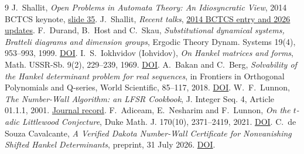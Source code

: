 \documentclass[10pt]{article}
\begin{document}
\begin{thebibliography}{9}\small\setlength{\itemsep}{1pt}
 J.~Shallit, \emph{Open Problems in Automata Theory: An Idiosyncratic View}, 2014 BCTCS keynote, \href{https://cs.uwaterloo.ca/~shallit/Talks/bc4.pdf#page=35}{slide 35}.
 J.~Shallit, \emph{Recent talks}, \href{https://cs.uwaterloo.ca/~shallit/talks.html}{2014 BCTCS entry and 2026 updates}.
 F.~Durand, B.~Host and C.~Skau, \emph{Substitutional dynamical systems, Bratteli diagrams and dimension groups}, Ergodic Theory Dynam. Systems 19(4), 953--993, 1999. \href{https://doi.org/10.1017/S0143385799133947}{DOI}.
 I.~S.~Iokhvidov (Iohvidov), \emph{On Hankel matrices and forms}, Math. USSR-Sb. 9(2), 229--239, 1969. \href{https://doi.org/10.1070/SM1969v009n02ABEH001129}{DOI}.
 A.~Bakan and C.~Berg, \emph{Solvability of the Hankel determinant problem for real sequences}, in Frontiers in Orthogonal Polynomials and Q-series, World Scientific, 85--117, 2018. \href{https://doi.org/10.1142/9789813228887_0005}{DOI}.
 W.~F.~Lunnon, \emph{The Number-Wall Algorithm: an LFSR Cookbook}, J. Integer Seq. 4, Article 01.1.1, 2001. \href{https://cs.uwaterloo.ca/journals/JIS/VOL4/LUNNON/numbwall10.html}{Journal record}.
 F.~Adiceam, E.~Nesharim and F.~Lunnon, \emph{On the \(t\)-adic Littlewood Conjecture}, Duke Math. J. 170(10), 2371--2419, 2021. \href{https://doi.org/10.1215/00127094-2020-0077}{DOI}.
 C.~de Souza Cavalcante, \emph{A Verified Dakota Number-Wall Certificate for Nonvanishing Shifted Hankel Determinants}, preprint, 31 July 2026. \href{https://doi.org/10.5281/zenodo.21728308}{DOI}.
\end{thebibliography}
\end{document}
